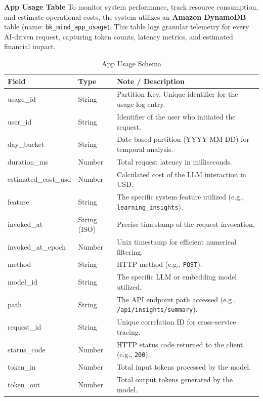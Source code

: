 \newpage

\textbf{App Usage Table}
To monitor system performance, track resource consumption, and estimate operational costs, the system utilizes an \textbf{Amazon DynamoDB} table (name: \texttt{bk\_mind\_app\_usage}). This table logs granular telemetry for every AI-driven request, capturing token counts, latency metrics, and estimated financial impact.

\begin{table}[H]
    \centering
    \begin{tabular}{llp{8cm}}
        \toprule
        \textbf{Field} & \textbf{Type} & \textbf{Note / Description} \\
        \midrule
        usage\_id & String & Partition Key. Unique identifier for the usage log entry. \\
        \midrule
        user\_id & String & Identifier of the user who initiated the request. \\
        day\_bucket & String & Date-based partition (YYYY-MM-DD) for temporal analysis. \\
        duration\_ms & Number & Total request latency in milliseconds. \\
        estimated\_cost\_usd & Number & Calculated cost of the LLM interaction in USD. \\
        feature & String & The specific system feature utilized (e.g., \texttt{learning\_insights}). \\
        invoked\_at & String (ISO) & Precise timestamp of the request invocation. \\
        invoked\_at\_epoch & Number & Unix timestamp for efficient numerical filtering. \\
        method & String & HTTP method (e.g., \texttt{POST}). \\
        model\_id & String & The specific LLM or embedding model utilized. \\
        path & String & The API endpoint path accessed (e.g., \texttt{/api/insights/summary}). \\
        request\_id & String & Unique correlation ID for cross-service tracing. \\
        status\_code & Number & HTTP status code returned to the client (e.g., \texttt{200}). \\
        token\_in & Number & Total input tokens processed by the model. \\
        token\_out & Number & Total output tokens generated by the model. \\
        \bottomrule
    \end{tabular}
    \caption{App Usage Schema}
    \label{tab:app_usage}
\end{table}


